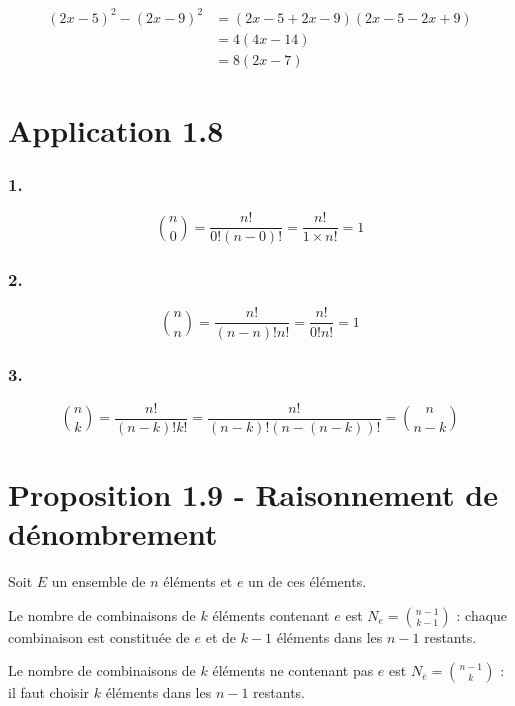\documentclass{report}
\begin{document}
\begin{equation*}
	\begin{split}
		(2x-5)^2 - (2x - 9)^2 &= (2x-5+2x-9)(2x-5-2x+9) \\
		&= 4(4x-14) \\
		&= 8(2x-7)
	\end{split}
\end{equation*}



\section*{Application 1.8}

\subsubsection*{1.}

\begin{displaymath}
	\binom{n}{0}= \frac{n!}{0!(n-0)!}= \frac{n!}{1 \times n!}=1
\end{displaymath}

\subsubsection*{2.}
\begin{displaymath}
	\binom{n}{n}= \frac{n!}{(n-n)!n!}= \frac{n!}{0!n!}=1
\end{displaymath}


\subsubsection*{3.}
\begin{displaymath}
	\binom{n}{k}= \frac{n!}{(n-k)!k!}= \frac{n!}{(n-k)!(n-(n-k))!}=\binom{n}{n-k}
\end{displaymath}



\section*{Proposition 1.9 - Raisonnement de dénombrement}

Soit $E$ un ensemble de $n$ éléments et $e$ un de ces éléments.

Le nombre de combinaisons de $k$ éléments contenant $e$ est $N_e = \binom{n-1}{k-1}$ : chaque combinaison est
constituée de $e$ et de $k-1$ éléments dans les $n-1$ restants.

Le nombre de combinaisons de $k$ éléments ne contenant pas $e$ est $N_{\bar{e}} = \binom{n-1}{k}$ : il faut choisir $k$ éléments dans les $n-1$ restants.
\end{document}

